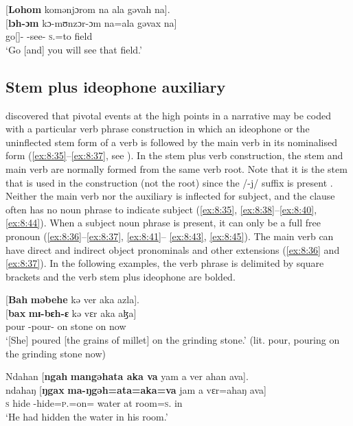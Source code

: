 \ea \label{ex:8:34}
{}[\textbf{Lohom}  komənjɔrom  na  ala  gəvah  na].\\
\gll  {}[\textbf{lɔh-ɔm}    kɔ-mʊnzɔr-ɔm   na=ala      gəvax  na]\\
      go[{\IMP}]-{\twoP}   {\twoP}-see-{\twoP}  \textsc{s}.{\DO}=to  field  {\PSP}\\
\glt  ‘Go [and] you will see that field.' 
\z

\subsection{Stem plus ideophone auxiliary}\label{sec:8.2.3}
\hypertarget{RefHeading1212601525720847}{}
\largerpage \citet{FriesenMamalis2008} discovered that pivotal events at the high points in a narrative may be coded with a particular verb phrase construction in which an ideophone or the uninflected stem form of a verb is followed by the main verb in its nominalised form (\ref{ex:8:35}--\ref{ex:8:37}, see ).  In the stem plus verb construction, the stem and main verb are normally formed from the same verb root. Note that it is the stem that is used in the construction (not the root) since the /-j/ suffix is present . Neither the main verb nor the auxiliary is inflected for subject, and the clause often has no noun phrase to indicate subject (\ref{ex:8:35}, \ref{ex:8:38}--\ref{ex:8:40}, \ref{ex:8:44}). When a subject noun phrase is present, it can only be a full free pronoun (\ref{ex:8:36}--\ref{ex:8:37},  \ref{ex:8:41}-- \ref{ex:8:43},  \ref{ex:8:45}). The main verb can have direct and indirect object pronominals and other extensions (\ref{ex:8:36} and \ref{ex:8:37}). In the following examples, the verb phrase is delimited by square brackets and the verb stem plus ideophone are bolded. 

\ea \label{ex:8:35}
{}[\textbf{Bah}  \textbf{məbehe}  kə  ver  aka  azla].\\
\gll  {}[\textbf{bax}    \textbf{mɪ-bɛh-ɛ}    kə  vɛr  aka  aɮa]\\
      pour   {\NOM}{}-pour-{\CL}  on  stone  on  now\\
\glt  ‘[She] poured [the grains of millet] on the grinding stone.’\textit{ }(lit. pour, pouring on the grinding stone now)
\z


\ea \label{ex:8:36}
Ndahan  [\textbf{ngah}  \textbf{mangəhata  aka  va}  yam  a  ver  ahan  ava].\\
\gll  ndahaŋ  [\textbf{ŋgax}  \textbf{ma-ŋgəh=ata=aka=va}  jam  a  vɛr=ahaŋ    ava]\\
      \textsc{s}    hide  {\NOM}{}-hide=\textsc{p}.{\IO}=on={\PRF}  water  at  room=\textsc{s}.{\POSS}  in\\
\glt  ‘He had hidden the water in his room.’
\z

